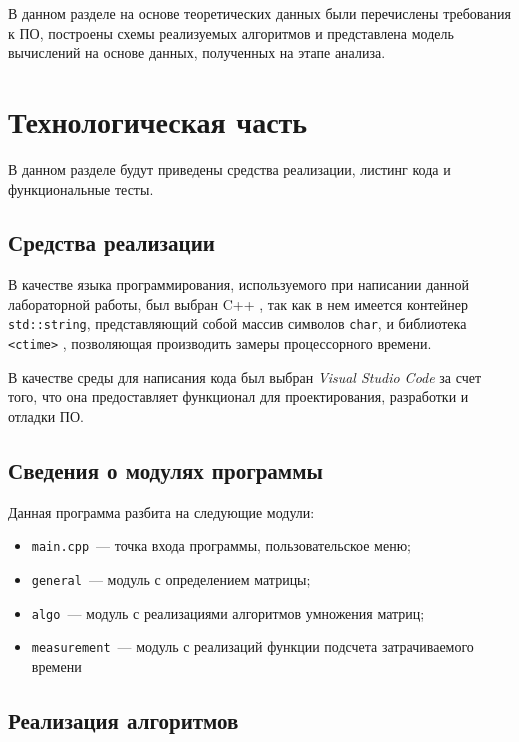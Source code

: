 В данном разделе на основе теоретических данных были перечислены требования к ПО, построены схемы реализуемых алгоритмов и представлена модель вычислений на основе данных, полученных на этапе анализа.

\clearpage

\chapter{Технологическая часть}
В данном разделе будут приведены средства реализации, листинг кода и функциональные тесты.

\section{Средства реализации}

В качестве языка программирования, используемого при написании данной лабораторной работы, был выбран C++ \cite{cpp-lang}, так как в нем имеется контейнер \texttt{std::string}, представляющий собой массив символов \texttt{char}, и библиотека \texttt{<ctime>} \cite{ctime}, позволяющая производить замеры процессорного времени.

В качестве среды для написания кода был выбран \textit{Visual Studio Code} за счет того, что она предоставляет функционал для проектирования, разработки и отладки ПО.

\section{Сведения о модулях программы}

Данная программа разбита на следующие модули:

\begin{itemize}
    \item \texttt{main.cpp}~--- точка входа программы, пользовательское меню;
    \item \texttt{general}~--- модуль с определением матрицы;
    \item \texttt{algo}~--- модуль с реализациями алгоритмов умножения матриц;
    \item \texttt{measurement}~--- модуль с реализаций функции подсчета затрачиваемого времени
\end{itemize}

\clearpage

\section{Реализация алгоритмов}

